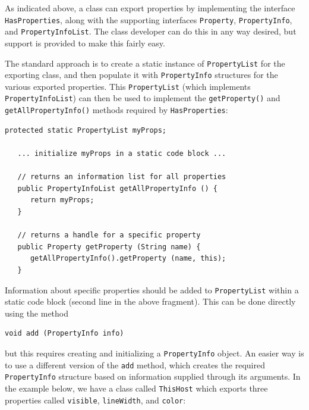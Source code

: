 As indicated above, a class can export properties by implementing the
interface {\tt HasProperties}, along with the supporting interfaces
{\tt Property}, {\tt PropertyInfo}, and {\tt PropertyInfoList}.  The
class developer can do this in any way desired, but support is
provided to make this fairly easy.

The standard approach is to create a static instance of 
{\tt PropertyList} for the exporting class, and then populate it with
{\tt PropertyInfo} structures for the various exported properties. This
{\tt PropertyList} (which implements {\tt PropertyInfoList}) can then
be used to implement the {\tt getProperty()} and {\tt getAllPropertyInfo()} 
methods required by {\tt HasProperties}:
\begin{lstlisting}[]
   protected static PropertyList myProps;
 
   ... initialize myProps in a static code block ...

   // returns an information list for all properties
   public PropertyInfoList getAllPropertyInfo () {
      return myProps;
   }

   // returns a handle for a specific property
   public Property getProperty (String name) {
      getAllPropertyInfo().getProperty (name, this);
   }
\end{lstlisting}

Information about specific properties should be added to {\tt PropertyList} 
within a static code block (second line in the above
fragment). This can be done directly using the method
\begin{lstlisting}[]
   void add (PropertyInfo info)
\end{lstlisting}
but this requires creating and initializing a {\tt PropertyInfo}
object. An easier way is to use a different version of the {\tt add}
method, which creates the required {\tt PropertyInfo} 
structure based on information supplied through its
arguments.  In the example below, we have a class
called {\tt ThisHost} which exports three properties called {\tt visible}, 
{\tt lineWidth}, and {\tt color}:

